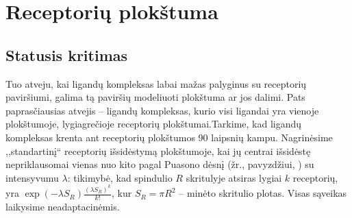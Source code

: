 \documentclass[10pt]{article}
\begin{document}
\section{Receptorių plokštuma}
\subsection{Statusis kritimas}
Tuo atveju, kai ligandų kompleksas labai mažas palyginus su 
receptorių paviršiumi, galima tą paviršių modeliuoti plokštuma ar jos dalimi. 
Pats paprasčiausias atvejis -- ligandų kompleksas, kurio visi ligandai yra vienoje plokštumoje, lygiagrečioje  receptorių plokštumai.Tarkime, kad ligandų kompleksas  krenta ant receptorių plokštumos 90 laipsnių kampu. Nagrinėsime ,,standartinį``  receptorių išsidėstymą plokštumoje, kai  jų centrai išsidėstę nepriklausomai vienas nuo kito pagal Puasono dėsnį (žr., pavyzdžiui, \cite{Lange03}) su intensyvumu $\lambda$:  tikimybė, kad spindulio $R$ skritulyje atsiras lygiai $k$ receptorių, yra $ \exp(-\lambda S_R)\frac{(\lambda S_R)^k}{k!} $, kur $S_R = \pi R^2$ -- minėto skritulio plotas. Visas sąveikas laikysime neadaptacinėmis. 


\end{document}
